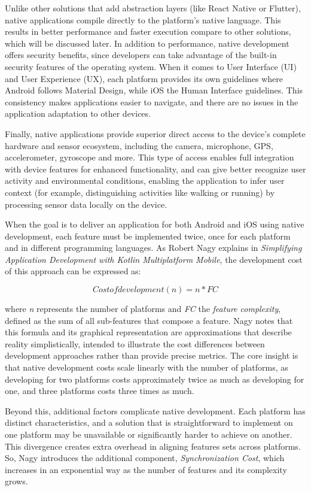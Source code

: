 Unlike other solutions that add abstraction layers (like React Native or Flutter), native applications compile directly to the platform's native language. This results in better performance and faster execution compare to other solutions, which will be discussed later. In addition to performance, native development offers security benefits, since developers can take advantage of the built-in security features of the operating system.
When it comes to User Interface (UI) and User Experience (UX), each platform provides its own guidelines where Android follows Material Design, while iOS the Human Interface guidelines. This consistency makes applications easier to navigate, and there are no issues in the application adaptation to other devices.\cite{Nagy2022} 

Finally, native applications provide superior direct access to the device's complete hardware and sensor ecosystem, including the camera, microphone, GPS, accelerometer, gyroscope and more\cite{Nagy2022}. This type of access enables full integration with device features for enhanced functionality, and can give better recognize user activity and environmental conditions, enabling the application to infer user context (for example, distinguishing activities like walking or running) by processing sensor data locally on the device\cite{santos}.

When the goal is to deliver an application for both Android and iOS using native development, each feature must be implemented twice, once for each platform and in different programming languages.
As Robert Nagy explains in \textit{Simplifying Application Development with Kotlin Multiplatform Mobile}\cite{Nagy2022}, the development cost of this approach can be expressed as:


\[Cost of development (n) = n * FC\]

where \textit{n} represents the number of platforms and \textit{FC} the \textit{feature complexity}, defined as the sum of all sub-features that compose a feature.
Nagy notes that this formula and its graphical representation are approximations that describe reality simplistically, intended to illustrate the cost differences between development approaches rather than provide precise metrics.\cite{Nagy2022} The core insight is that native development costs scale linearly with the number of platforms, as developing for two platforms costs approximately twice as much as developing for one, and three platforms costs three times as much.

Beyond this, additional factors complicate native development. Each platform has distinct characteristics, and a solution that is straightforward to implement on one platform may be unavailable or significantly harder to achieve on another. This divergence creates extra overhead in aligning features sets across platforms. So, Nagy introduces the additional component, \textit{Synchronization Cost}, which increases in an exponential way as the number of features and its complexity grows.


